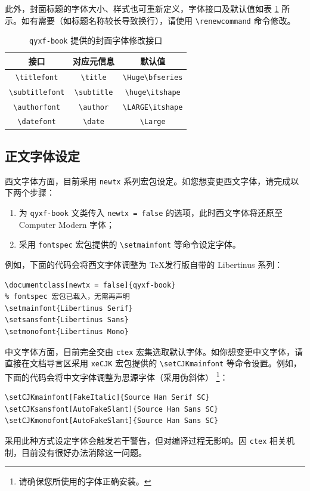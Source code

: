 \documentclass[
    10pt,
    oneside,
    openany,
    b5paper,
    colorscheme = black  %
]{qyxf-book}
\renewcommand{\titlefont}{\Huge\bfseries}
\renewcommand{\subtitlefont}{\LARGE\itshape}
\begin{document}
此外，封面标题的字体大小、样式也可重新定义，字体接口及默认值如表 \ref{tab:preface-font} 所示。如有需要（如标题名称较长导致换行），请使用 \verb|\renewcommand| 命令修改。

\begin{table}[htbp]
\centering
\caption{\texttt{qyxf-book} 提供的封面字体修改接口}
\label{tab:preface-font}
\begin{tabular}{ccc}
\toprule
接口 & 对应元信息 & 默认值\\
\midrule
\verb|\titlefont| & \verb|\title| & \verb|\Huge\bfseries| \\
\verb|\subtitlefont| & \verb|\subtitle| & \verb|\huge\itshape| \\
\verb|\authorfont| & \verb|\author| & \verb|\LARGE\itshape| \\
\verb|\datefont| & \verb|\date| & \verb|\Large| \\
\bottomrule
\end{tabular}
\end{table}

\subsection{正文字体设定}

西文字体方面，目前采用 \verb|newtx| 系列宏包设定。如您想变更西文字体，请完成以下两个步骤：

\begin{enumerate}
    \item 为 \verb|qyxf-book| 文类传入 \verb|newtx = false| 的选项，此时西文字体将还原至 Computer Modern 字体；
    \item 采用 \verb|fontspec| 宏包提供的 \verb|\setmainfont| 等命令设定字体。
\end{enumerate}

例如，下面的代码会将西文字体调整为 \TeX 发行版自带的 Libertinus 系列：

\begin{tcolorbox}
\begin{verbatim}
\documentclass[newtx = false]{qyxf-book}
% fontspec 宏包已载入，无需再声明
\setmainfont{Libertinus Serif}
\setsansfont{Libertinus Sans}
\setmonofont{Libertinus Mono}
\end{verbatim}
\end{tcolorbox}

中文字体方面，目前完全交由 \verb|ctex| 宏集选取默认字体。如你想变更中文字体，请直接在文档导言区采用 \verb|xeCJK| 宏包提供的 \verb|\setCJKmainfont| 等命令设置。例如，下面的代码会将中文字体调整为思源字体（采用伪斜体）
\footnote{请确保您所使用的字体正确安装。}：
\begin{tcolorbox}
\begin{verbatim}
\setCJKmainfont[FakeItalic]{Source Han Serif SC}
\setCJKsansfont[AutoFakeSlant]{Source Han Sans SC}
\setCJKmonofont[AutoFakeSlant]{Source Han Sans SC}
\end{verbatim}
\end{tcolorbox}
采用此种方式设定字体会触发若干警告，但对编译过程无影响。因 \verb|ctex| 相关机制，目前没有很好办法消除这一问题。
\end{document}
